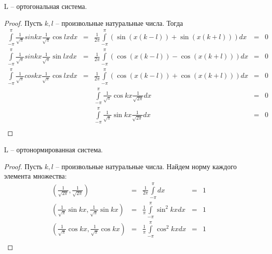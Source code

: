 \begin{statement}
    L -- ортогональная система.
    \begin{proof}
        Пусть $k, l$ -- произвольные натуральные числа. Тогда
        \[
            \begin{matrix}
                \int \limits_{-\pi}^{\pi} \frac{1}{\sqrt{\pi}} sin kx \frac{1}{\sqrt{\pi}} \cos lx dx
                & = &
                \frac{1}{2\pi} \int \limits_{-\pi}^{\pi} (\sin(x(k - l)) + \sin(x(k + l))) dx
                & = &
                0 \\
                \int \limits_{-\pi}^{\pi} \frac{1}{\sqrt{\pi}} sin kx \frac{1}{\sqrt{\pi}} \sin lx dx
                & = &
                \frac{1}{2\pi} \int \limits_{-\pi}^{\pi} (\cos(x(k - l)) - \cos(x(k + l))) dx
                & = &
                0 \\
                \int \limits_{-\pi}^{\pi} \frac{1}{\sqrt{\pi}} cos kx \frac{1}{\sqrt{\pi}} \cos lx dx
                & = &
                \frac{1}{2\pi} \int \limits_{-\pi}^{\pi} (\cos(x(k - l)) + \cos(x(k + l))) dx
                & = &
                0 \\  
                & & \int \limits_{-\pi}^{\pi} \frac{1}{\sqrt{\pi}} \cos kx \frac{1}{\sqrt{2\pi}} dx
                & = & 0 \\
                & & \int \limits_{-\pi}^{\pi} \frac{1}{\sqrt{\pi}} \sin kx \frac{1}{\sqrt{2\pi}} dx
                & = & 0 \\
            \end{matrix}
        \]
    \end{proof}
\end{statement}
\begin{statement}
    L -- ортонормированная система.
    \begin{proof}
        Пусть $k, l$ -- произвольные натуральные числа. Найдем норму каждого элемента множества:
        \[
            \begin{matrix}
                (\frac{1}{\sqrt{2\pi}}, \frac{1}{\sqrt{2\pi}})
                & = &
                \frac{1}{2\pi} \int \limits_{-\pi}^{\pi} dx
                & = &
                1 \\

                (\frac{1}{\sqrt{\pi}} \sin kx, \frac{1}{\sqrt{\pi}} \sin kx)
                & = &
                \frac{1}{\pi} \int \limits_{-\pi}^{\pi} \sin^2 kx dx
                & = &
                1 \\

                (\frac{1}{\sqrt{\pi}} \cos kx, \frac{1}{\sqrt{\pi}} \cos kx)
                & = &
                \frac{1}{\pi} \int \limits_{-\pi}^{\pi} \cos^2 kx dx
                & = &
                1 \\
            \end{matrix}
        \]
    \end{proof}
\end{statement}